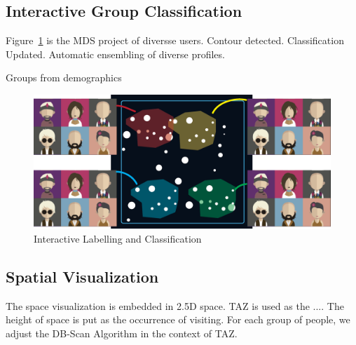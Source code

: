 \subsection{Interactive Group Classification}

Figure~\ref{fig:mds} is the MDS project of diversse users. Contour detected. Classification Updated. Automatic ensembling of diverse profiles. 

Groups from demographics

\begin{figure}[htb!]
 \centering %
 \includegraphics[width=\columnwidth]{pictures/mds}
 \caption{Interactive Labelling and Classification}
 \label{fig:mds}
\end{figure}

\subsection{Spatial Visualization}

The space visualization is embedded in 2.5D space. TAZ is used as the .... The height of space is put as the occurrence of visiting. For each group of people, we adjust the DB-Scan Algorithm in the context of TAZ. 